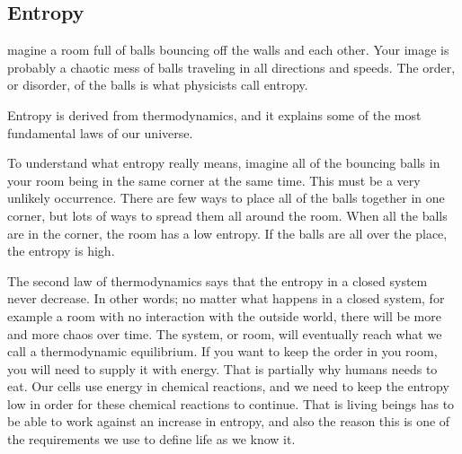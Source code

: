 \subsection*{Entropy}
magine a room full of balls bouncing off the walls and each other.
Your image is probably a chaotic mess of balls traveling in all directions and speeds.
The order, or disorder, of the balls is what physicists call entropy.

Entropy is derived from thermodynamics, and it explains some of the most fundamental laws of our universe.

To understand what entropy really means, imagine all of the bouncing balls in your room being in the same corner at the same time.
This must be a very unlikely occurrence.
There are few ways to place all of the balls together in one corner, but lots of ways to spread them all around the room.
When all the balls are in the corner, the room has a low entropy.
If the balls are all over the place, the entropy is high.


The second law of thermodynamics says that the entropy in a closed system never decrease.
In other words; no matter what happens in a closed system, for example a room with no interaction with the outside world, there will be more and more chaos over time.
The system, or room, will eventually reach what we call a thermodynamic equilibrium.
If you want to keep the order in you room, you will need to supply it with energy.
That is partially why humans needs to eat.
Our cells use energy in chemical reactions, and we need to keep the entropy low in order for these chemical reactions to continue.
That is living beings has to be able to work against an increase in entropy, and also the reason this is one of the requirements we use to define life as we know it.